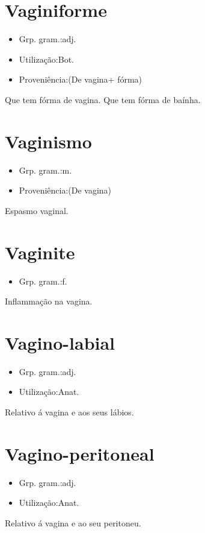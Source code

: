 \documentclass{article}
\begin{document}
\section{Vaginiforme}
\begin{itemize}
\item {Grp. gram.:adj.}
\end{itemize}
\begin{itemize}
\item {Utilização:Bot.}
\end{itemize}
\begin{itemize}
\item {Proveniência:(De \textunderscore vagina\textunderscore  + \textunderscore fórma\textunderscore )}
\end{itemize}
Que tem fórma de vagina.
Que tem fórma de baínha.
\section{Vaginismo}
\begin{itemize}
\item {Grp. gram.:m.}
\end{itemize}
\begin{itemize}
\item {Proveniência:(De \textunderscore vagina\textunderscore )}
\end{itemize}
Espasmo vaginal.
\section{Vaginite}
\begin{itemize}
\item {Grp. gram.:f.}
\end{itemize}
Inflammação na vagina.
\section{Vagino-labial}
\begin{itemize}
\item {Grp. gram.:adj.}
\end{itemize}
\begin{itemize}
\item {Utilização:Anat.}
\end{itemize}
Relativo á vagina e aos seus lábios.
\section{Vagino-peritoneal}
\begin{itemize}
\item {Grp. gram.:adj.}
\end{itemize}
\begin{itemize}
\item {Utilização:Anat.}
\end{itemize}
Relativo á vagina e ao seu peritoneu.
\end{document}

